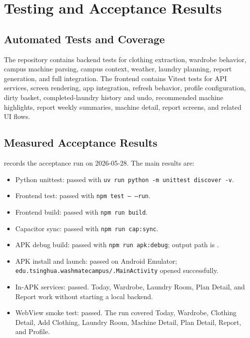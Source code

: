 \documentclass[11pt,a4paper]{article}
\begin{document}
\section{Testing and Acceptance Results}

\subsection{Automated Tests and Coverage}

The repository contains backend tests for clothing extraction, wardrobe behavior, campus machine parsing, campus context, weather, laundry planning, report generation, and full integration. The frontend contains Vitest tests for API services, screen rendering, app integration, refresh behavior, profile configuration, dirty basket, completed-laundry history and undo, recommended machine highlights, report weekly summaries, machine detail, report screens, and related UI flows.

\subsection{Measured Acceptance Results}

 records the acceptance run on 2026-05-28. The main results are:

\begin{itemize}
  \item Python unittest: passed with \texttt{uv run python -m unittest discover -v}.
  \item Frontend test: passed with \texttt{npm test -- --run}.
  \item Frontend build: passed with \texttt{npm run build}.
  \item Capacitor sync: passed with \texttt{npm run cap:sync}.
  \item APK debug build: passed with \texttt{npm run apk:debug}; output path is .
  \item APK install and launch: passed on Android Emulator; \texttt{edu.tsinghua.washmatecampus/.MainActivity} opened successfully.
  \item In-APK services: passed. Today, Wardrobe, Laundry Room, Plan Detail, and Report work without starting a local backend.
  \item WebView smoke test: passed. The run covered Today, Wardrobe, Clothing Detail, Add Clothing, Laundry Room, Machine Detail, Plan Detail, Report, and Profile.
\end{itemize}
\end{document}
